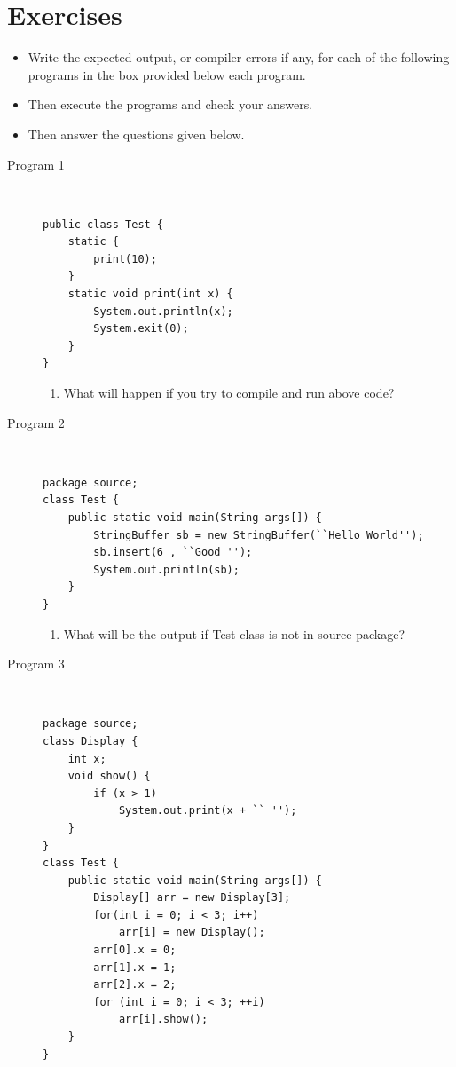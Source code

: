 \documentclass[11pt,a4paper]{article}
\def\AnswerBox{\fbox{\begin{minipage}{4in}\hfill\vspace{0.5in}\end{minipage}}}
\begin{document}
    \section*{Exercises}
\begin{itemize}
\item Write the expected output, or compiler errors if any, for each of the following programs in the box provided below each program.
\item Then execute the programs and check your answers.
\item Then answer the questions given below.
\end{itemize}
\begin{description}
\item [Program 1] \
\begin{lstlisting}
public class Test {
    static {
        print(10);
    }
    static void print(int x) {
        System.out.println(x);
        System.exit(0);
    }
}
\end{lstlisting}

\AnswerBox

\begin{enumerate}[label=\bfseries Q\arabic*:]\itemsep10pt
        \item What will happen if you try to compile and run above code?
    \end{enumerate}

\item [Program 2] \
    \begin{lstlisting}
package source;
class Test {
    public static void main(String args[]) {
        StringBuffer sb = new StringBuffer(``Hello World'');
        sb.insert(6 , ``Good '');
        System.out.println(sb);
    }
}
\end{lstlisting}

\AnswerBox

\begin{enumerate}[label=\bfseries Q\arabic*:]\itemsep10pt
\item What will be the output if Test class is not in source package?
\end{enumerate}

\item [Program 3] \
\begin{lstlisting}
package source;
class Display {
    int x;
    void show() {
        if (x > 1)
            System.out.print(x + `` '');
    }
}
class Test {
    public static void main(String args[]) {
        Display[] arr = new Display[3];
        for(int i = 0; i < 3; i++)
            arr[i] = new Display();
        arr[0].x = 0;      
        arr[1].x = 1;
        arr[2].x = 2;
        for (int i = 0; i < 3; ++i)
            arr[i].show();
    }
}
\end{lstlisting}
                       

\end{description}
\end{document}
